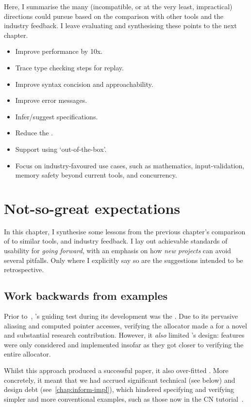 Here, I summarise the many (incompatible, or at the very least, impractical)
directions  could pursue based on the comparison with other tools
and the industry feedback. I leave evaluating and synthesising these points
to the next chapter.
\begin{itemize}
    \item Improve performance by 10x.
    \item Trace type checking steps for replay.
    \item Improve syntax concision and approachability.
    \item Improve error messages.
    \item Infer/suggest specifications.
    \item Reduce the .
    \item Support using  `out-of-the-box'.
    \item Focus on industry-favoured use cases, such as mathematics,
        input-validation, memory safety beyond current tools, and concurrency.
\end{itemize}

\chapter{Not-so-great expectations}\label{chap:expectations}

\margintoc{}

In this chapter, I synthesise some lessons from the previous chapter's
comparison of  to similar tools, and industry feedback. I lay out
achievable standards of usability for  \emph{going forward}, with an
emphasis on how \emph{new projects} can avoid several pitfalls. Only where I
explicitly say so are the suggestions intended to be retrospective.

\section{Work backwards from examples}

Prior to~\textcite{pulte2023cn}, 's guiding test during its development
was the  . Due to its pervasive aliasing and
computed pointer accesses, verifying the allocator made a for a novel and
substantial research contribution. However, it \emph{also} limited 's
design: features were only considered and implemented insofar as they got
 closer to verifying the entire allocator.

Whilst this approach produced a successful paper, it also over-fitted .
More concretely, it meant that we had accrued significant technical (see below)
and design debt (see~\cref{chap:inform-impl}), which hindered specifying and
verifying simpler and more conventional examples, such as those now in the
CN tutorial~\cite{pulte2024tutorial}.

